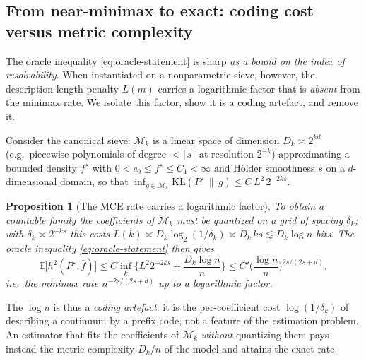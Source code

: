 \documentclass[12pt]{article}
\newtheorem{proposition}[theorem]{Proposition}
\numberwithin{equation}{section}
\begin{document}
	\subsection{From near-minimax to exact: coding cost versus metric complexity}
	\label{sec:log-gap}

	The oracle inequality \eqref{eq:oracle-statement} is sharp \emph{as a bound on
	the index of resolvability}. When instantiated on a nonparametric sieve,
	however, the description-length penalty $L(m)$ carries a logarithmic factor
	that is \emph{absent} from the minimax rate. We isolate this factor, show it is
	a coding artefact, and remove it.

	Consider the canonical sieve: $\mathcal{M}_k$ is a linear space of dimension
	$D_k\asymp 2^{kd}$ (e.g.\ piecewise polynomials of degree $<\lceil s\rceil$ at
	resolution $2^{-k}$) approximating a bounded density $f^{\star}$ with
	$0<c_0\le f^{\star}\le C_1<\infty$ and Hölder smoothness $s$ on a
	$d$-dimensional domain, so that
	$\inf_{g\in\mathcal{M}_k}\mathrm{KL}(P^{\star}\,\|\,g)\le C\,L^2\,2^{-2ks}$.

	\begin{proposition}[The MCE rate carries a logarithmic factor]
		\label{prop:mce-log}
		To obtain a countable family the coefficients of $\mathcal{M}_k$ must be
		quantized on a grid of spacing $\delta_k$; with $\delta_k\asymp 2^{-ks}$
		this costs $L(k)\asymp D_k\log_2(1/\delta_k)\asymp D_k\,ks\lesssim
		D_k\log n$ bits. The oracle inequality \eqref{eq:oracle-statement} then
		gives
		\[
		\mathbb{E}\big[h^2(P^{\star},\widehat f)\big]
		\le C\inf_k\Big\{L^2 2^{-2ks}+\frac{D_k\log n}{n}\Big\}
		\le C'\Big(\frac{\log n}{n}\Big)^{2s/(2s+d)},
		\]
		i.e.\ the minimax rate $n^{-2s/(2s+d)}$ \emph{up to a logarithmic factor}.
	\end{proposition}

	The $\log n$ is thus a \emph{coding artefact}: it is the per-coefficient cost
	$\log(1/\delta_k)$ of describing a continuum by a prefix code, not a feature of
	the estimation problem. An estimator that fits the coefficients of
	$\mathcal{M}_k$ \emph{without} quantizing them pays instead the metric
	complexity $D_k/n$ of the model and attains the exact rate.
\end{document}
